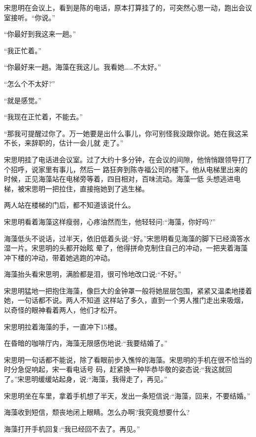 \documentclass[11pt,a4paper,onecolumn]{article}
\begin{document}
宋思明在会议上，看到是陈的电话，原本打算挂了的，可突然心思一动，跑出会议室接听。``你说。''

``你最好到我这来一趟。''

``我正忙着。''

``你最好来一趟。海藻在我这儿。我看她……不太好。''

``怎么个不太好?''

``就是感觉。''

``我现在正忙着，不能去。''

``那我可提醒过你了。万一她要是出什么事儿，你可别怪我没跟你说。她在我这呆不长，来辞职的，估计一会儿就
走了。''

宋思明挂了电话进会议室。过了大约十多分钟，在会议的间隙，他悄悄跟领导打了个招呼，说家里有事儿，然后一
路狂奔到陈寺福公司的楼下。他从电梯里出来的时候，正见海藻站在电梯旁等着，四目相对，百味流动。海藻一低
头想逃进电梯，被宋思明一把拉住，直接拖她到了逃生梯。

两人站在楼梯的门后，都不知道该说什么。

宋思明看着海藻这样瘦弱，心疼油然而生，他轻轻问:``海藻，你好吗?''

海藻低头不说话，过半天，依旧低着头说:``好。''宋思明看见海藻的脚下已经滴答水湿一片。宋思明的头都开始眩
晕了，他得拼命克制住自己的冲动，一把夹着海藻冲下楼的冲动，带着她逃跑的冲动。

海藻抬头看宋思明，满脸都是泪，很可怜地改口说:``不好。''

宋思明猛地一把抱住海藻，像巨大的金钟罩一般将她层层包围，紧紧又温柔地搂着她，一句话都不说。两人不知道
这样站了多久，直到一个男人推门走出来吸烟，以奇怪的眼神看着两人，他们才松开。

宋思明拉着海藻的手，一直冲下15楼。

在昏暗的咖啡厅内，海藻无限感伤地说:``我要结婚了。''

宋思明一句话都不能说，除了看眼前步入憔悴的海藻。宋思明的手机在很不恰当的时分急促响起，宋一看电话号
码，赶紧换一种毕恭毕敬的姿态说:``我这就回了。''宋思明缓缓站起身，说:``海藻，我得走了，再见。''

宋思明坐在车里，拿着手机想了半天，发出一条短信说:``海藻，回来，不要结婚。''

海藻收到短信，颓丧地闭上眼睛。怎么办啊?我究竟想要什么?

海藻打开手机回复:``我已经回不去了。再见。''

\section[\thesection]{}
\end{document}
